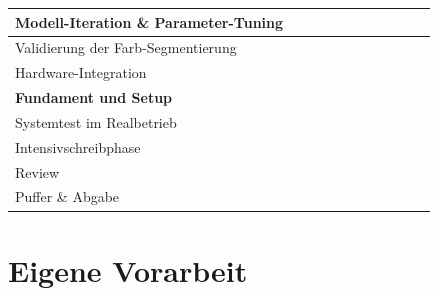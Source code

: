 \begin{center}
\begin{tabular}{|l|l|l|l|l|l|l|l|l|l|l|}
Modell-Iteration \& Parameter-Tuning                       &                        &                          &                          & \cellcolor[HTML]{C0C0C0} &  &                          &                          &                          &                          &                          \\ \hline
Validierung der Farb-Segmentierung  &   &   &    &    &  \cellcolor[HTML]{C0C0C0} &  &  &                          &                          &                          \\ \hline
Hardware-Integration &  &  &  &  &  & \cellcolor[HTML]{C0C0C0} &  &  &  &                          \\ \hline
\cellcolor[HTML]{9B9B9B}\textbf{Fundament und Setup} &   &   &  &  &  &  &    \cellcolor[HTML]{9B9B9B}   & \cellcolor[HTML]{9B9B9B} & \cellcolor[HTML]{9B9B9B} & \cellcolor[HTML]{9B9B9B} \\ \hline
Systemtest im Realbetrieb &  &  &  &  &  &  & \cellcolor[HTML]{C0C0C0} & \cellcolor[HTML]{C0C0C0} &  &  \\ \hline
Intensivschreibphase  &  &   &  &    &   &    &  \cellcolor[HTML]{C0C0C0}  & \cellcolor[HTML]{C0C0C0} &   &     \\ \hline
Review &  &  &   &                          &                          &                          &                          & \cellcolor[HTML]{FFFFFF} & \cellcolor[HTML]{C0C0C0} &                          \\ \hline
Puffer \& Abgabe                                           &                          &                          &                          &                          &                          &                          &                          &                          &                          & \cellcolor[HTML]{C0C0C0} \\ \hline
                                             
\end{tabular}


\end{center}


\section{Eigene Vorarbeit}

